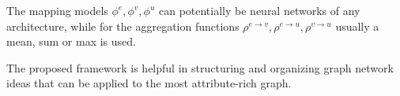 The mapping models $\phi^e, \phi^v, \phi^u$ can potentially be neural networks of any architecture, while for the aggregation functions $\rho^{e \to v},\rho^{e \to u},\rho^{v \to u}$ usually a mean, sum or max is used.

The proposed framework is helpful in structuring and organizing graph network ideas that can be applied to the most attribute-rich graph.